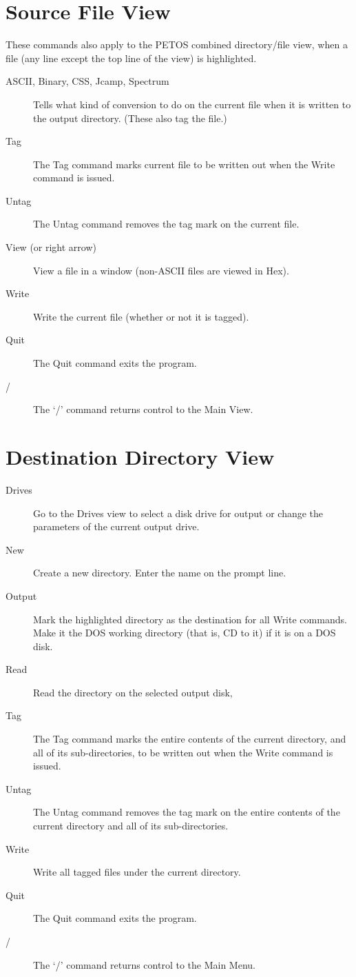 \begin{itemize}
\section{Source File View}
These commands also apply to the PETOS combined directory/file view,
when a file (any line except the top line of the view) is highlighted.

\noindent
\begin{description}
\item[ASCII, Binary, CSS, Jcamp, Spectrum]\nl
           Tells what kind of conversion to do on the current file
           when it is written to the output directory.  (These also
           tag the file.)
\item[Tag]\nl
           The Tag command marks current file to be written out
           when the Write command is issued.
\item[Untag]\nl
           The Untag command removes the tag mark on the current file.
\item[View (or right arrow)]\nl
           View a file in a window (non-ASCII files are viewed in Hex).
\item[Write]\nl
           Write the current file (whether or not it is tagged).
\item[Quit]\nl
           The Quit command exits the program.
\item[/]\nl
           The `/' command returns control to the Main View.
\end{description}


\section{Destination Directory View}
\begin{description}
\item[Drives]\nl
           Go to the Drives view to select a disk drive for output
           or change the parameters of the current output drive.
\item[New]\nl
           Create a new directory.  Enter the name on the prompt line.
\item[Output]\nl
           Mark the highlighted directory as the destination for
           all Write commands.  Make it the DOS working directory
           (that is, CD to it) if it is on a DOS disk.
\item[Read]\nl
           Read the directory on the selected output disk,
\item[Tag]\nl
           The Tag command marks the entire contents of the current
           directory, and all of its sub-directories, to be written
           out when the Write command is issued.
\item[Untag]\nl
           The Untag command removes the tag mark on the entire contents
           of the current directory and all of its sub-directories.
\item[Write]\nl
           Write all tagged files under the current directory.
\item[Quit]\nl
           The Quit command exits the program.
\item[/]\nl
           The `/' command returns control to the Main Menu.
\end{description}



\end{itemize}
